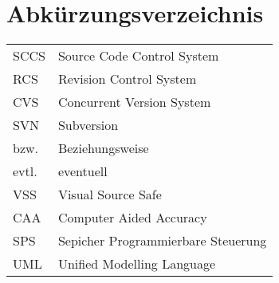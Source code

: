\chapter*{Abkürzungsverzeichnis}
\begin{tabular}{ll}
SCCS & Source Code Control System \\ 
RCS & Revision Control System \\ 
CVS & Concurrent Version System \\
SVN & Subversion \\
bzw. & Beziehungsweise \\
evtl. & eventuell \\ 
VSS & Visual Source Safe \\
CAA & Computer Aided Accuracy \\
SPS & Sepicher Programmierbare Steuerung \\
UML & Unified Modelling Language
\end{tabular} 